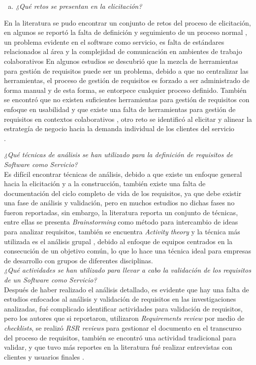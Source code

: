 \documentclass[conference,onecolumn,10pt]{IEEEtran}
\begin{document}
\begin{enumerate}[(a)]
\item \emph{¿Qué retos se presentan en la elicitación?}
\end{enumerate}
En la literatura se pudo encontrar un conjunto de retos del proceso de elicitación, en algunos 
se reportó la falta de definición y seguimiento de un proceso normal \cite{EF-2, EF-16, EF-19}, un problema 
evidente en el software como servicio, es falta de estándares relacionados al área \cite{EF-2} y 
la complejidad de comunicación en ambientes de trabajo colaborativos \cite{EF-7}
En algunos estudios se descubrió que la mezcla de herramientas para gestión de requisitos \cite{EF-4, EF-9} puede ser 
un problema, debido a que no centralizar las herramientas, el proceso de gestión de requisitos es forzado a ser 
administrado de forma manual y de esta forma, se entorpece cualquier proceso definido. 
También se encontró que no existen suficientes herramientas para gestión de requisitos con enfoque en usabilidad \cite{EF-8}
y que existe una falta de herramientas para gestión de requisitos en contextos colaborativos \cite{EF-9}, otro reto 
se identificó al elicitar y alinear la estrategía de negocio hacia la demanda individual de los clientes del servicio \cite{EF-18}\\ .

\emph{¿Qué técnicas de análisis se han utilizado para la definición de requisitos de Software como Servicio?}\\
Es difícil encontrar técnicas de análisis, debido a que existe un enfoque general hacia la elicitación y a la construcción, 
también existe una falta de documentación del ciclo completo de vida de los requisitos, ya que debe existir una fase de 
análisis y validación, pero en muchos estudios no dichas fases no fueron reportadas, sin embargo, la literatura reporta 
un conjunto de técnicas, entre ellas 
se presenta \emph{Brainstorming} \cite{EF-10} como método para intercambio de ideas para analizar requisitos, también se encuentra
\emph{Activity theory} \cite{EF-7} y la técnica más utilizada es el análisis grupal \cite{EF-3, EF-4, EF-13, EF-17, EF-19}, debido 
al enfoque de equipos centrados en la consecución de un objetivo común, lo que lo hace una técnica ideal para empresas de desarrollo
con grupos de diferentes disciplinas. \\ 

\emph{¿Qué actividades se han utilizado para llevar a cabo la validación de los requisitos de un Software como Servicio?}\\
Después de haber realizado el análisis detallado, es evidente que hay una falta de estudios enfocados al análisis y validación 
de requisitos en las investigaciones analizadas, fué complicado identificar actividades para validación de requisitos, pero 
los autores que si reportaron, utilizaron \emph{Requirements review} \cite{EF-1, EF-3} por medio de \emph{checklists}, se realizó 
\emph{RSR reviews} \cite{EF-6} para gestionar el documento en el transcurso del proceso de requisitos, también se encontró una actividad tradicional 
para validar, y que tuvo más reportes en la literatura fué realizar entrevistas con clientes y usuarios finales \cite{EF-2, EF-4, EF-5, EF-8, EF-9, EF-12, EF-19}.
\end{document}
